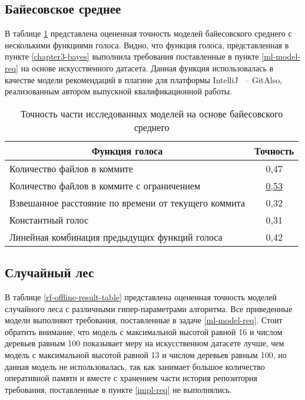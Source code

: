     \subsection{Байесовское среднее}\label{bayes-quality-offline}
В таблице \ref{bayes-offline-result-table} представлена оцененная точность моделей байесовского среднего с несколькими функциями голоса. Видно, что функция голоса, представленная в пункте \ref{chapter3-bayes} выполнила требования поставленные в пункте \ref{ml-model-req} на основе искусственного датасета. Данная функция использовалась в качестве модели рекомендаций в плагине для платформы IntelliJ ~-- GitAlso, реализованным автором выпускной квалификационной работы.
        \begin{table}[!h]   
        \caption{Точность части исследованных моделей на основе байесовского среднего}\label{bayes-offline-result-table}
        \centering
        \begin{tabular}{|l|c|}\hline
        \multicolumn{1}{|c|}{\textbf{Функция голоса}} & \textbf{Точность}\\\hline
        Количество файлов в коммите & 0,47\\\hline
        Количество файлов в коммите с ограничением  & \uline{0,53} \\\hline
        Взвешанное расстояние по времени от текущего коммита  & 0,32\\\hline
        Константный голос  & 0,31\\\hline
        Линейная комбинация предыдущих функций голоса  & 0,42\\\hline
        \end{tabular}
        \end{table}
    \subsection{Случайный лес}\label{forest-quality-offline}
В таблице \ref{rf-offline-result-table} представлена оцененная точность моделей случайного леса с различными гипер-параметрами алгоритма. Все приведенные модели выполняют требования, поставленные в задаче \ref{ml-model-req}. Стоит обратить внимание, что модель с максимальной высотой равной 16 и числом деревьев равным 100 показывает меру на искусственном датасете лучше, чем модель с максимальной высотой равной 13 и числом деревьев равным 100, но данная модель не использовалась, так как занимает большое количество оперативной памяти и вместе с хранением части история репозитория требования, поставленные в пункте \ref{impl-req} не выполнялись. 

